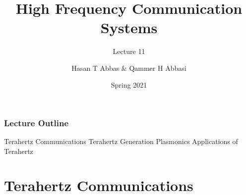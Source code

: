 \documentclass[10pt]{beamer}
\title{High Frequency Communication Systems}
\subtitle{Lecture 11}
\date{Spring 2021}
\author{Hasan T Abbas \& Qammer H Abbasi}
\begin{document}
\maketitle

\begin{frame}[fragile]
    \frametitle{Lecture Outline}
    \begin{outline}[itemize]
        \1 Terahertz Communications
        \1 Terahertz Generation
        \1 Plasmonics
        \1 Applications of Terahertz
    \end{outline}
\end{frame}

\section{Terahertz Communications}
\end{document}
